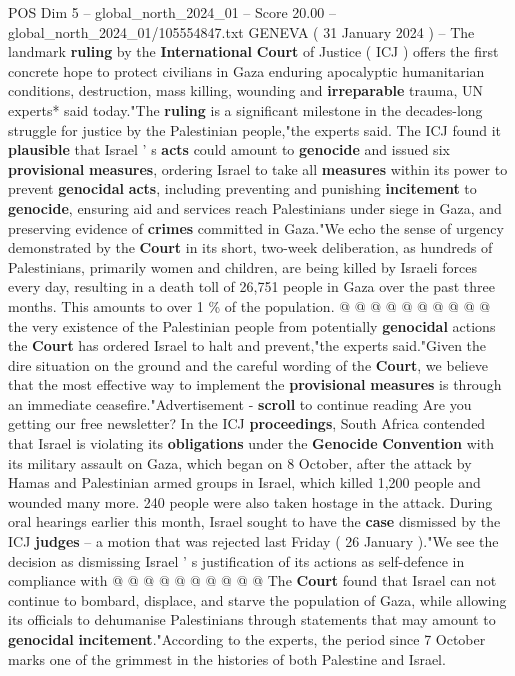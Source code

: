 \begin{textsample}{POS Dim 5 – global\_north\_2024\_01 – Score 20.00 – global\_north\_2024\_01/105554847.txt}  \label{ex:f5_pos_117}
GENEVA ( 31 January 2024 ) -- The landmark \textbf{ruling} by the \textbf{International} \textbf{Court} of Justice ( ICJ ) offers the first concrete hope to protect civilians in Gaza enduring apocalyptic humanitarian conditions, destruction, mass killing, wounding and \textbf{irreparable} trauma, UN experts* said today."The \textbf{ruling} is a significant milestone in the decades-long struggle for justice by the Palestinian people,"the experts said.
The ICJ found it \textbf{plausible} that Israel ' s \textbf{acts} could amount to \textbf{genocide} and issued six \textbf{provisional} \textbf{measures}, ordering Israel to take all \textbf{measures} within its power to prevent \textbf{genocidal} \textbf{acts}, including preventing and punishing \textbf{incitement} to \textbf{genocide}, ensuring aid and services reach Palestinians under siege in Gaza, and preserving evidence of \textbf{crimes} committed in Gaza."We echo the sense of urgency demonstrated by the \textbf{Court} in its short, two-week deliberation, as hundreds of Palestinians, primarily women and children, are being killed by Israeli forces every day, resulting in a death toll of 26,751 people in Gaza over the past three months.
This amounts to over 1 \% of the population. @ @ @ @ @ @ @ @ @ @ the very existence of the Palestinian people from potentially \textbf{genocidal} actions the \textbf{Court} has ordered Israel to halt and prevent,"the experts said."Given the dire situation on the ground and the careful wording of the \textbf{Court}, we believe that the most effective way to implement the \textbf{provisional} \textbf{measures} is through an immediate ceasefire."Advertisement - \textbf{scroll} to continue reading Are you getting our free newsletter?
In the ICJ \textbf{proceedings}, South Africa contended that Israel is violating its \textbf{obligations} under the \textbf{Genocide} \textbf{Convention} with its military assault on Gaza, which began on 8 October, after the attack by Hamas and Palestinian armed groups in Israel, which killed 1,200 people and wounded many more. 240 people were also taken hostage in the attack.
During oral hearings earlier this month, Israel sought to have the \textbf{case} dismissed by the ICJ \textbf{judges} -- a motion that was rejected last Friday ( 26 January )."We see the decision as dismissing Israel ' s justification of its actions as self-defence in compliance with @ @ @ @ @ @ @ @ @ @ The \textbf{Court} found that Israel can not continue to bombard, displace, and starve the population of Gaza, while allowing its officials to dehumanise Palestinians through statements that may amount to \textbf{genocidal} \textbf{incitement}."According to the experts, the period since 7 October marks one of the grimmest in the histories of both Palestine and Israel.

\end{textsample}

